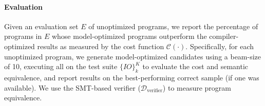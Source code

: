 \documentclass{article}
\def\correctfuncsmt/{\ensuremath{\mathcal{D}_\textrm{verifier}}}
\begin{document}


\paragraph{Evaluation}
Given an evaluation set $E$ of unoptimized programs, we report the percentage of programs in $E$ whose model-optimized programs outperform the compiler-optimized results as measured by the cost function $\mathcal{C}(\cdot)$.
Specifically, for each unoptimized program, we generate model-optimized candidates using a beam-size of 10, executing all on the test suite $\{IO\}_{k}^K$ to evaluate the cost and semantic equivalence, and report results on the best-performing correct sample (if one was available). 
We use the SMT-based verifier ($\correctfuncsmt/$) to measure program equivalence. 
\end{document}
